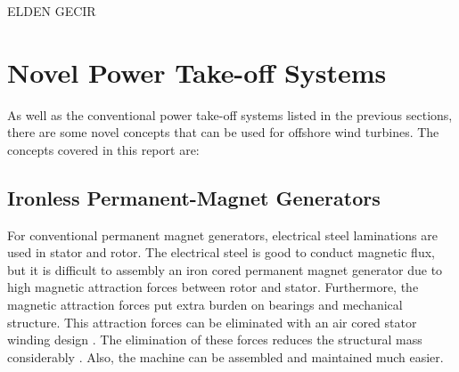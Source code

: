\documentclass[a4paper, 11pt]{article} %
\begin{document}
ELDEN GECIR

\section{Novel Power Take-off Systems}

As well as the conventional power take-off systems listed in the previous sections, there are some novel concepts that can be used for offshore wind turbines. The concepts covered in this report are:

\subsection{Ironless Permanent-Magnet Generators}

For conventional permanent magnet generators, electrical steel laminations are used in stator and rotor. The electrical steel is good to conduct magnetic flux, but it is difficult to assembly an iron cored permanent magnet generator due to high magnetic attraction forces between rotor and stator. Furthermore, the magnetic attraction forces put extra burden on bearings and mechanical structure. This attraction forces can be eliminated with an air cored stator winding design \cite{Mueller2009}. The elimination of these forces reduces the structural mass considerably \cite{McDonald2008b}. Also, the machine can be assembled and maintained much easier. 
\end{document}

